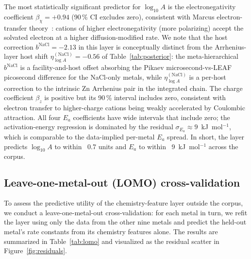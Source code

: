 \documentclass[11pt]{article}
\theoremstyle{plain}
\theoremstyle{definition}
\theoremstyle{remark}
\newcommand{\Ea}{E_a}
\begin{document}
The most statistically significant predictor for $\log_{10}\!A$ is the
electronegativity coefficient $\beta_\chi = +0.94$ (90\,\% CI excludes
zero), consistent with Marcus electron-transfer theory~\citep{Marcus1965}:
cations of higher electronegativity (more polarizing) accept the solvated
electron at a higher diffusion-modified rate.  We note that the host
correction $b^{\mathrm{NaCl}} = -2.13$ in this layer is conceptually
distinct from the Arrhenius-layer host shift
$\eta_{\log A}^{(\mathrm{NaCl})} = -0.56$ of Table~\ref{tab:posterior}:
the meta-hierarchical $b^{\mathrm{NaCl}}$ is a facility-and-host offset
absorbing the Pikaev microsecond-vs-LEAF picosecond difference for the
NaCl-only metals, while $\eta_{\log A}^{(\mathrm{NaCl})}$ is a per-host
correction to the intrinsic Zn Arrhenius pair in the integrated chain.  The charge coefficient $\beta_z$ is
positive but its 90\,\% interval includes zero, consistent with electron
transfer to higher-charge cations being weakly accelerated by Coulombic
attraction.  All four $\Ea$ coefficients have wide intervals that include
zero; the activation-energy regression is dominated by the residual
$\sigma_{\Ea} \approx 9$~kJ~mol$^{-1}$, which is comparable to the
data-implied per-metal $\Ea$ spread.  In short, the layer predicts
$\log_{10}\!A$ to within ~0.7 units and $\Ea$ to within ~9~kJ~mol$^{-1}$
across the corpus.

\subsection{Leave-one-metal-out (LOMO) cross-validation}\label{sec:meta:lomo}

To assess the predictive utility of the chemistry-feature layer outside the
corpus, we conduct a leave-one-metal-out cross-validation: for each metal
in turn, we refit the layer using only the data from the other nine metals
and predict the held-out metal's rate constants from its chemistry
features alone.  The results are summarized in Table~\ref{tab:lomo} and
visualized as the residual scatter in Figure~\ref{fig:residuals}.
\end{document}
